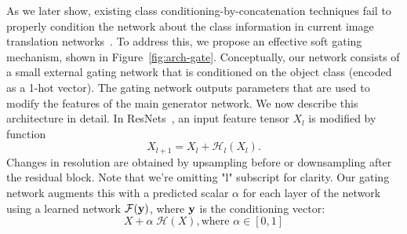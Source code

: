 As we later show, existing class conditioning-by-concatenation techniques fail to properly condition the network about the class information in current image translation networks~\cite{isola2016image2image,zhu2017toward}.
%
To address this, we propose an effective soft gating mechanism, shown in Figure~\ref{fig:arch-gate}.
Conceptually, our network consists of a small external gating network that is conditioned on the object class (encoded as a 1-hot vector).
The gating network outputs parameters that are used to modify the features of the main generator network.
We now describe this architecture in detail.
%
In ResNets~\cite{he2016deep}, an input feature tensor $X_l$ is modified by function
\begin{equation}
X_{l+1} = X_l+\mathcal{H}_l(X_l).
\end{equation}
Changes in resolution are obtained by upsampling before or downsampling after the residual block.
Note that we're omitting "l" subscript for clarity.
Our gating network augments this with a predicted scalar $\alpha$ for each layer of the network using a learned network $\mathcal{F}({\bf y})$, where  ${\bf y}$ is the conditioning vector:
\begin{equation}
X + \alpha \; \mathcal{H}(X), \text{where } \alpha \in [0,1]
\end{equation}

